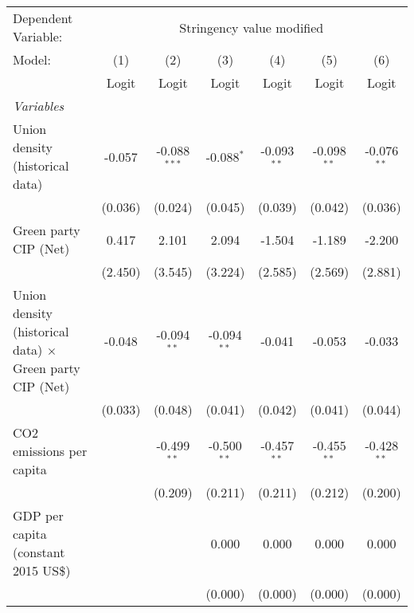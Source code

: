 
\begingroup
\centering
\begin{tabular}{lcccccc}
   \toprule
   Dependent Variable: & \multicolumn{6}{c}{Stringency value modified}\\
   Model:                                                          & (1)     & (2)            & (3)           & (4)           & (5)           & (6)\\  
                                                                   &  Logit  & Logit          & Logit         & Logit         & Logit         & Logit\\  
   \midrule
   \emph{Variables}\\
   Union density (historical data)                                 & -0.057  & -0.088$^{***}$ & -0.088$^{*}$  & -0.093$^{**}$ & -0.098$^{**}$ & -0.076$^{**}$\\   
                                                                   & (0.036) & (0.024)        & (0.045)       & (0.039)       & (0.042)       & (0.036)\\   
   Green party CIP (Net)                                           & 0.417   & 2.101          & 2.094         & -1.504        & -1.189        & -2.200\\   
                                                                   & (2.450) & (3.545)        & (3.224)       & (2.585)       & (2.569)       & (2.881)\\   
   Union density (historical data) $\times$ Green party CIP (Net)  & -0.048  & -0.094$^{**}$  & -0.094$^{**}$ & -0.041        & -0.053        & -0.033\\   
                                                                   & (0.033) & (0.048)        & (0.041)       & (0.042)       & (0.041)       & (0.044)\\   
   CO2 emissions per capita                                        &         & -0.499$^{**}$  & -0.500$^{**}$ & -0.457$^{**}$ & -0.455$^{**}$ & -0.428$^{**}$\\   
                                                                   &         & (0.209)        & (0.211)       & (0.211)       & (0.212)       & (0.200)\\   
   GDP per capita (constant 2015 US\$)                             &         &                & 0.000         & 0.000         & 0.000         & 0.000\\   
                                                                   &         &                & (0.000)       & (0.000)       & (0.000)       & (0.000)\\   

\end{tabular}
